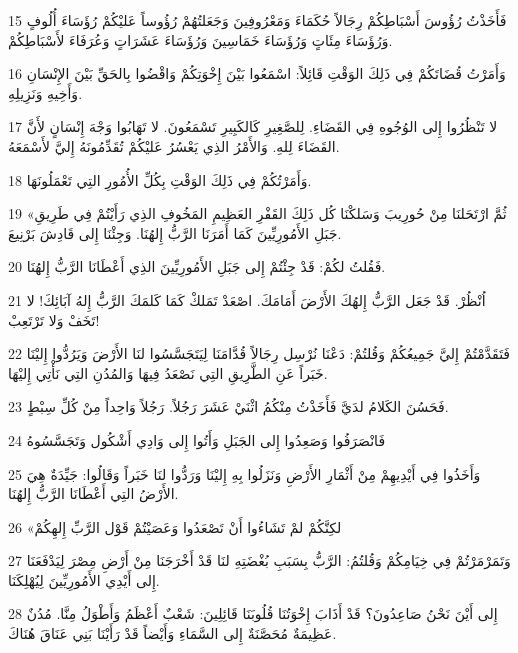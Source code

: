 \par 15 فَأَخَذْتُ رُؤُوسَ أَسْبَاطِكُمْ رِجَالاً حُكَمَاءَ وَمَعْرُوفِينَ وَجَعَلتُهُمْ رُؤُوساً عَليْكُمْ رُؤَسَاءَ أُلُوفٍ وَرُؤَسَاءَ مِئَاتٍ وَرُؤَسَاءَ خَمَاسِينَ وَرُؤَسَاءَ عَشَرَاتٍ وَعُرَفَاءَ لأَسْبَاطِكُمْ.
\par 16 وَأَمَرْتُ قُضَاتَكُمْ فِي ذَلِكَ الوَقْتِ قَائِلاً: اسْمَعُوا بَيْنَ إِخْوَتِكُمْ وَاقْضُوا بِالحَقِّ بَيْنَ الإِنْسَانِ وَأَخِيهِ وَنَزِيلِهِ.
\par 17 لا تَنْظُرُوا إِلى الوُجُوهِ فِي القَضَاءِ. لِلصَّغِيرِ كَالكَبِيرِ تَسْمَعُونَ. لا تَهَابُوا وَجْهَ إِنْسَانٍ لأَنَّ القَضَاءَ لِلهِ. وَالأَمْرُ الذِي يَعْسُرُ عَليْكُمْ تُقَدِّمُونَهُ إِليَّ لأَسْمَعَهُ.
\par 18 وَأَمَرْتُكُمْ فِي ذَلِكَ الوَقْتِ بِكُلِّ الأُمُورِ التِي تَعْمَلُونَهَا.
\par 19 «ثُمَّ ارْتَحَلنَا مِنْ حُورِيبَ وَسَلكْنَا كُل ذَلِكَ القَفْرِ العَظِيمِ المَخُوفِ الذِي رَأَيْتُمْ فِي طَرِيقِ جَبَلِ الأَمُورِيِّينَ كَمَا أَمَرَنَا الرَّبُّ إِلهُنَا. وَجِئْنَا إِلى قَادِشَ بَرْنِيعَ.
\par 20 فَقُلتُ لكُمْ: قَدْ جِئْتُمْ إِلى جَبَلِ الأَمُورِيِّينَ الذِي أَعْطَانَا الرَّبُّ إِلهُنَا.
\par 21 اُنْظُرْ. قَدْ جَعَل الرَّبُّ إِلهُكَ الأَرْضَ أَمَامَكَ. اصْعَدْ تَمَلكْ كَمَا كَلمَكَ الرَّبُّ إِلهُ آبَائِكَ! لا تَخَفْ وَلا تَرْتَعِبْ!
\par 22 فَتَقَدَّمْتُمْ إِليَّ جَمِيعُكُمْ وَقُلتُمْ: دَعْنَا نُرْسِل رِجَالاً قُدَّامَنَا لِيَتَجَسَّسُوا لنَا الأَرْضَ وَيَرُدُّوا إِليْنَا خَبَراً عَنِ الطَّرِيقِ التِي نَصْعَدُ فِيهَا وَالمُدُنِ التِي نَأْتِي إِليْهَا.
\par 23 فَحَسُنَ الكَلامُ لدَيَّ فَأَخَذْتُ مِنْكُمُ اثْنَيْ عَشَرَ رَجُلاً. رَجُلاً وَاحِداً مِنْ كُلِّ سِبْطٍ.
\par 24 فَانْصَرَفُوا وَصَعِدُوا إِلى الجَبَلِ وَأَتُوا إِلى وَادِي أَشْكُول وَتَجَسَّسُوهُ
\par 25 وَأَخَذُوا فِي أَيْدِيهِمْ مِنْ أَثْمَارِ الأَرْضِ وَنَزَلُوا بِهِ إِليْنَا وَرَدُّوا لنَا خَبَراً وَقَالُوا: جَيِّدَةٌ هِيَ الأَرْضُ التِي أَعْطَانَا الرَّبُّ إِلهُنَا.
\par 26 «لكِنَّكُمْ لمْ تَشَاءُوا أَنْ تَصْعَدُوا وَعَصَيْتُمْ قَوْل الرَّبِّ إِلهِكُمْ
\par 27 وَتَمَرْمَرْتُمْ فِي خِيَامِكُمْ وَقُلتُمُ: الرَّبُّ بِسَبَبِ بُغْضَتِهِ لنَا قَدْ أَخْرَجَنَا مِنْ أَرْضِ مِصْرَ لِيَدْفَعَنَا إِلى أَيْدِي الأَمُورِيِّينَ لِيُهْلِكَنَا.
\par 28 إِلى أَيْنَ نَحْنُ صَاعِدُونَ؟ قَدْ أَذَابَ إِخْوَتُنَا قُلُوبَنَا قَائِلِينَ: شَعْبٌ أَعْظَمُ وَأَطْوَلُ مِنَّا. مُدُنٌ عَظِيمَةٌ مُحَصَّنَةٌ إِلى السَّمَاءِ وَأَيْضاً قَدْ رَأَيْنَا بَنِي عَنَاقَ هُنَاكَ.
